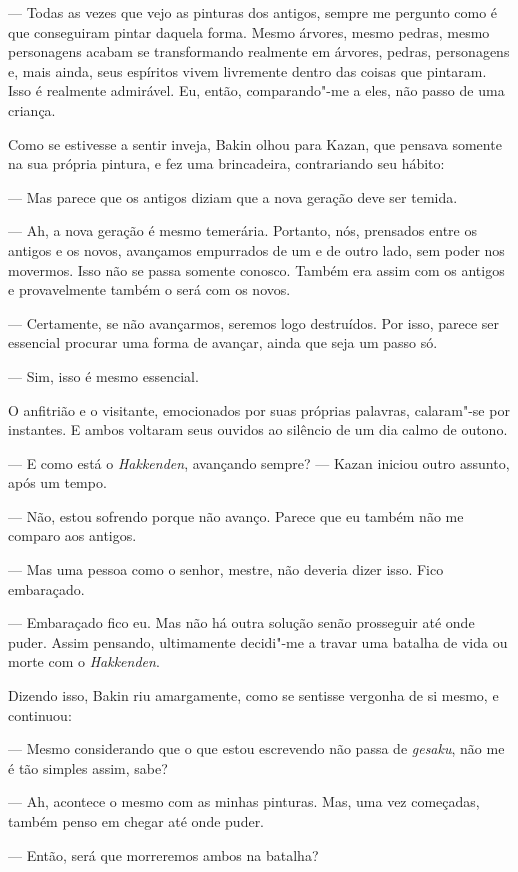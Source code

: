 --- Todas as vezes que vejo as pinturas dos antigos, sempre me pergunto
como é que conseguiram pintar daquela forma. Mesmo árvores, mesmo
pedras, mesmo personagens acabam se transformando realmente em árvores,
pedras, personagens e, mais ainda, seus espíritos vivem livremente
dentro das coisas que pintaram. Isso é realmente admirável. Eu, então,
comparando"-me a eles, não passo de uma criança.

Como se estivesse a sentir inveja, Bakin olhou para Kazan, que pensava
somente na sua própria pintura, e fez uma brincadeira, contrariando seu
hábito:

--- Mas parece que os antigos diziam que a nova geração deve ser temida.

--- Ah, a nova geração é mesmo temerária. Portanto, nós, prensados entre
os antigos e os novos, avançamos empurrados de um e de outro lado, sem
poder nos movermos. Isso não se passa somente conosco. Também era assim
com os antigos e provavelmente também o será com os novos.

--- Certamente, se não avançarmos, seremos logo destruídos. Por isso,
parece ser essencial procurar uma forma de avançar, ainda que seja um
passo só.

--- Sim, isso é mesmo essencial.

O anfitrião e o visitante, emocionados por suas próprias palavras,
calaram"-se por instantes. E ambos voltaram seus ouvidos ao silêncio de
um dia calmo de outono.

--- E como está o \textit{Hakkenden}, avançando sempre? --- Kazan iniciou
outro assunto, após um tempo.

--- Não, estou sofrendo porque não avanço. Parece que eu também não me
comparo aos antigos.

--- Mas uma pessoa como o senhor, mestre, não deveria dizer isso. Fico
embaraçado.

--- Embaraçado fico eu. Mas não há outra solução senão prosseguir até onde
puder. Assim pensando, ultimamente decidi"-me a travar uma batalha de
vida ou morte com o \textit{Hakkenden}.

Dizendo isso, Bakin riu amargamente, como se sentisse vergonha de si
mesmo, e continuou:

--- Mesmo considerando que o que estou escrevendo não passa de
\textit{gesaku}, não me é tão simples assim, sabe? 

--- Ah, acontece o mesmo com as minhas pinturas. Mas, uma vez começadas,
também penso em chegar até onde puder.

--- Então, será que morreremos ambos na batalha?

